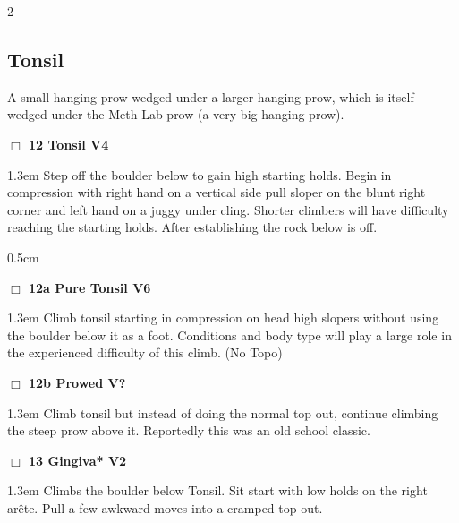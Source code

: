 \begin{multicols}{2}
\subsection*{Tonsil}\label{bf:Tonsil}
A small hanging prow wedged under a larger hanging prow, which is itself wedged under the Meth Lab prow (a very big hanging prow).\\
\needspace{2em}
\label{rt:Tonsil}
\colorbox{RoyalBlue!20}{
\parbox{0.95\linewidth}{
\hspace{-1ex}\textbf{$\Box$
12 Tonsil V4  
}}}
\begin{adjustwidth}{1.3em}{}			
Step off the boulder below to gain high starting holds. Begin in compression with right hand on a vertical side pull sloper on the blunt right corner and left hand on a juggy under cling.  Shorter climbers will have difficulty reaching the starting holds. After establishing the rock below is off.
\end{adjustwidth}
\begin{adjustwidth}{0.5cm}{}				
\needspace{4em}
\needspace{2em}
\label{vr:Pure Tonsil}
\colorbox{RoyalBlue!20}{
\parbox{0.95\linewidth}{
\hspace{-1ex}\textbf{$\Box$
12a Pure Tonsil V6  
}}}
\begin{adjustwidth}{1.3em}{}			
Climb tonsil starting in compression on head high slopers without using the boulder below it as a foot. Conditions and body type will play a large role in the experienced difficulty of this climb.
  (No Topo)
\end{adjustwidth}
\needspace{2em}
\label{vr:Prowed}
\colorbox{black!20}{
\parbox{0.95\linewidth}{
\hspace{-1ex}\textbf{$\Box$
12b Prowed V?  \warn\warn
}}}
\begin{adjustwidth}{1.3em}{}			
Climb tonsil but instead of doing the normal top out, continue climbing the steep prow above it. Reportedly this was an old school classic.
\end{adjustwidth}
\end{adjustwidth}
\needspace{2em}
\label{rt:Gingiva}
\colorbox{green!20}{
\parbox{0.95\linewidth}{
\hspace{-1ex}\textbf{$\Box$
13 Gingiva* V2  
}}}
\begin{adjustwidth}{1.3em}{}			
Climbs the boulder below Tonsil. Sit start with low holds on the right arête. Pull a few awkward moves into a cramped top out.
\end{adjustwidth}

\end{multicols}
